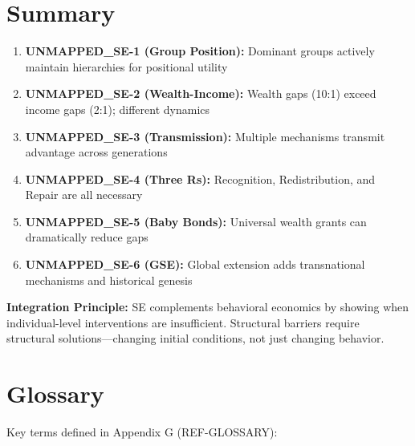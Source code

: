 \section{Summary}
\label{sec:se-summary}

\begin{tcolorbox}[colback=blue!5!white,colframe=blue!75!black,title=Key Takeaways]
\begin{enumerate}
    \item \textbf{UNMAPPED_SE-1 (Group Position):} Dominant groups actively maintain hierarchies for positional utility
    \item \textbf{UNMAPPED_SE-2 (Wealth-Income):} Wealth gaps (10:1) exceed income gaps (2:1); different dynamics
    \item \textbf{UNMAPPED_SE-3 (Transmission):} Multiple mechanisms transmit advantage across generations
    \item \textbf{UNMAPPED_SE-4 (Three Rs):} Recognition, Redistribution, and Repair are all necessary
    \item \textbf{UNMAPPED_SE-5 (Baby Bonds):} Universal wealth grants can dramatically reduce gaps
    \item \textbf{UNMAPPED_SE-6 (GSE):} Global extension adds transnational mechanisms and historical genesis
\end{enumerate}

\textbf{Integration Principle:} SE complements behavioral economics by showing when individual-level interventions are insufficient. Structural barriers require structural solutions---changing initial conditions, not just changing behavior.
\end{tcolorbox}

\section{Glossary}
\label{sec:se-glossary}

Key terms defined in Appendix G (REF-GLOSSARY):

